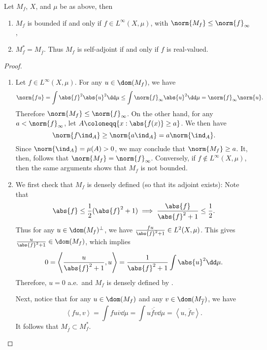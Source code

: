 \documentclass[oneside,reqno,letterpaper]{amsart}
\begin{document}
\begin{proposition}
\label{thm:multiplication-operator-adjoint}
  Let \(M_f\), \(X\), and \(\mu\) be as above, then 
  \begin{enumerate}[label=(\alph*)]
    \item \(M_f\) is bounded if and only if \(f \in L^{\infty}(X, \mu)\), with \(\norm{M_f} \leq \norm{f}_{\infty}\), 
    \item \(M_f^* = M_{\overline{f}}\). Thus \(M_f\) is self-adjoint if and only if \(f\) is real-valued. 
  \end{enumerate}
\end{proposition}
\begin{proof}~
\begin{enumerate}[label=(\alph*)]
  \item %
  Let \(f \in L^{\infty}(X, \mu)\). 
  For any \(u \in \dom(M_f)\), we have 
  \[
    \norm{f u}
    = \int \abs{f}^2 \abs{u}^2 \dd\mu
    \leq \int \norm{f}_{\infty} \abs{u}^2 \dd\mu   
    = \norm{f}_{\infty} \norm{u} . 
  \] 
  Therefore \(\norm{M_f} \leq \norm{f}_{\infty}\). 
  On the other hand, for any \(a < \norm{f}_{\infty}\), let \(A \coloneqq \{x: \abs{f(x)} \geq a\}\). 
  We then have 
  \[
  \norm{f \ind_{A}} \geq \norm{a \ind_{A}} = a \norm{\ind_{A}} . 
  \] 
  Since \(\norm{\ind_{A}} = \mu(A) > 0\), we may conclude that \(\norm{M_f}  \geq a\). 
  It, then, follows that \(\norm{M_f} = \norm{f}_{\infty}\). 
  Conversely, if \(f \not\in L^{\infty}(X, \mu)\), then the same arguments shows that \(M_f\) is not bounded. 
  
  \item %
  We first check that \(M_f\) is densely defined (so that its adjoint exists): 
  Note that 
  \[
    \abs{f} \leq \frac{1}{2} ( \abs{f}^2 + 1 )  \implies  \frac{\abs{f}}{\abs{f}^2 + 1} \leq \frac{1}{2} . 
  \] 
  Thus for any \(u \in \dom(M_f)^\perp\), we have \(\frac{f u}{\abs{f}^2 + 1} \in L^2(X, \mu)\).
  This gives \(\frac{u}{\abs{f}^2 + 1} \in \dom(M_f)\), which implies 
  \[
    0 = \left< \frac{u}{\abs{f}^2 + 1}, u \right> = \frac{1}{\abs{f}^2 + 1} \int \abs{u}^2 \dd\mu. 
  \] 
  Therefore, \(u = 0\) a.e.\ and \(M_f\) is densely defined by . 

  Next, notice that for any \(u \in \dom(M_f)\) and any \(v \in \dom(M_{\overline{f}})\), we have
  \[
    \left< fu, v \right> 
    = \int fu \overline{v} \dd\mu
    = \int u \overline{\overline{f}v} \dd\mu
    = \left< u, \overline{f} v \right> . 
  \]
  It follows that \(M_{\overline{f}} \subset M_f^*\). 


\end{enumerate}
\end{proof}
\end{document}
